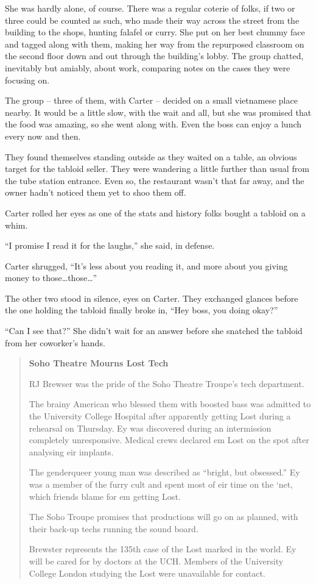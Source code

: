 She was hardly alone, of course.  There was a regular coterie of folks, if two or three could be counted as such, who made their way across the street from the building to the shops, hunting falafel or curry.  She put on her best chummy face and tagged along with them, making her way from the repurposed classroom on the second floor down and out through the building's lobby.  The group chatted, inevitably but amiably, about work, comparing notes on the cases they were focusing on.

The group -- three of them, with Carter -- decided on a small vietnamese place nearby.  It would be a little slow, with the wait and all, but she was promised that the food was amazing, so she went along with.  Even the boss can enjoy a lunch every now and then.

They found themselves standing outside as they waited on a table, an obvious target for the tabloid seller.  They were wandering a little further than usual from the tube station entrance.  Even so, the restaurant wasn't that far away, and the owner hadn't noticed them yet to shoo them off.

Carter rolled her eyes as one of the stats and history folks bought a tabloid on a whim.

``I promise I read it for the laughs,'' she said, in defense.

Carter shrugged, ``It's less about you reading it, and more about you giving money to those\ldots{}those\ldots{}''

The other two stood in silence, eyes on Carter.  They exchanged glances before the one holding the tabloid finally broke in, ``Hey boss, you doing okay?''

``Can I see that?''  She didn't wait for an answer before she snatched the tabloid from her coworker's hands.

\begin{quotation}
  \textbf{Soho Theatre Mourns Lost Tech}

  RJ Brewser was the pride of the Soho Theatre Troupe's tech department.

  The brainy American who blessed them with boosted bass was admitted to the University College Hospital after apparently getting Lost during a rehearsal on Thursday.  Ey was discovered during an intermission completely unresponsive.  Medical crews declared em Lost on the spot after analysing eir implants.

  The genderqueer young man was described as ``bright, but obsessed.''  Ey was a member of the furry cult and spent most of eir time on the `net, which friends blame for em getting Lost.

  The Soho Troupe promises that productions will go on as planned, with their back-up techs running the sound board.

  Brewster represents the 135th case of the Lost marked in the world.  Ey will be cared for by doctors at the UCH.  Members of the University College London studying the Lost were unavailable for contact.
\end{quotation}

